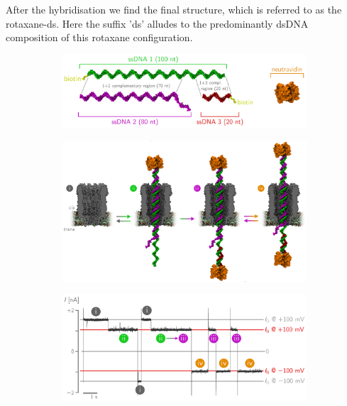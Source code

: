After the hybridisation we find the final structure, which is referred to as the
rotaxane-ds. Here the suffix 'ds' alludes to the predominantly dsDNA composition of
this rotaxane configuration.

\newpage

\begin{figure}[h!]
  \begin{centering}
  \begin{subfigure}[t]{\dimexpr.78\linewidth-1.3em\relax}
  \centering
  \includegraphics[width=\linewidth,valign=t]{Figures/RConstruction1.png}
  \end{subfigure}%
  \vspace{0.2cm}
  \begin{subfigure}[t]{\dimexpr.78\linewidth-1.3em\relax}
  \centering
  \includegraphics[width=\linewidth,valign=t]{Figures/RConstruction2.png}
  \end{subfigure}%
  \vspace{0.2cm}
  \begin{subfigure}[t]{\dimexpr.78\linewidth-1.3em\relax}
  \centering
  \includegraphics[width=\linewidth,valign=t]{Figures/RConstruction3.png}

\end{subfigure}
\end{centering}
\end{figure}
